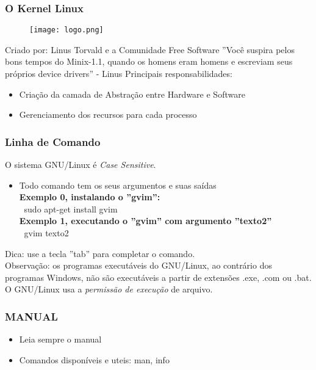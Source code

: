 \documentclass{beamer}
\begin{document}
\begin{frame}
    \frametitle{O Kernel Linux}
    
    \begin{figure}
        \texttt{[image: logo.png]}
    \end{figure}


    Criado por: Linus Torvald e a Comunidade Free Software
    \newline
    \newline
    ''Você suspira pelos bons tempos do Minix-1.1, quando os homens eram homens e escreviam seus próprios device drivers'' - Linus
        Principais responsabilidades:
    \begin{itemize}
        \item Criação da camada de Abstração entre Hardware e Software
        \item Gerenciamento dos recursos para cada processo
    \end{itemize}
\end{frame}

\begin{frame}   
    \frametitle{Linha de Comando}

    O sistema GNU/Linux é \textit{Case Sensitive}.

    \begin{itemize}
        \item Todo comando tem os seus argumentos e suas saídas\\
            \textbf{Exemplo 0, instalando o ''gvim'':}\\
            $\>$ sudo apt-get install gvim\\
            \textbf{Exemplo 1, executando o ''gvim'' com argumento ''texto2'' }\\
            $\>$ gvim texto2 \\
    \end{itemize}

    Dica: use a tecla ''tab'' para completar o comando.\\
    Observação: os programas executáveis do GNU/Linux, ao contrário dos programas
    Windows, não são executáveis a partir de extensões .exe, .com ou .bat. O GNU/Linux
    usa a \textit{permissão de execução} de arquivo.

\end{frame}

\begin{frame}
    \frametitle{MANUAL}
    
    \begin{itemize}
        \item Leia sempre o manual
        \item Comandos disponíveis e uteis: man, info
    \end{itemize}

\end{frame}
\end{document}
